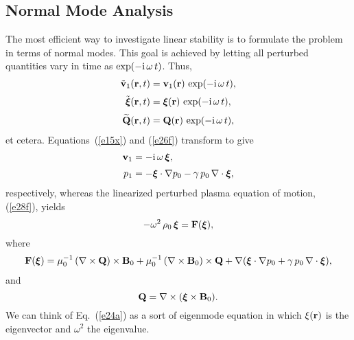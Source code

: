 \documentclass[12pt,prb,aps,notitlepage]{revtex4-1}
\newcommand{\bxi}{\mbox{\boldmath$\xi$}}
\begin{document}
\subsection{Normal Mode Analysis}
The most efficient way to investigate linear stability is to formulate 
 the problem in terms of normal modes. This goal is
achieved by letting all perturbed quantities vary in time as $\exp(-{\rm i}\,\omega\,t)$. 
Thus,
\begin{align}
\tilde{\bf v}_1({\bf r},t) &= {\bf v}_1({\bf r})\, \exp(-{\rm i}\,\omega\,t),\label{e33q}\\[0.5ex]
\tilde{\bxi}({\bf r},t)&= \bxi({\bf r})\, \exp(-{\rm i}\,\omega\,t),\\[0.5ex]
\widetilde{\bf Q}({\bf r},t) &= {\bf Q}({\bf r})\, \exp(-{\rm i}\,\omega\,t),
\end{align}
et cetera. 
Equations~(\ref{e15x}) and (\ref{e26f}) transform to give
\begin{align}\label{e15}
{\bf v}_1 &=-{\rm i}\,\omega\,\bxi,\\[0.5ex]
p_1&= -{\bxi}\cdot\nabla p_0 -\gamma\,p_0\,\nabla\cdot{\bxi},\label{e15t}
\end{align}
respectively, 
whereas the linearized perturbed plasma equation of motion, (\ref{e28f}), yields
\begin{equation}\label{e24a}
-\omega^2\,\rho_0\,\bxi= {\bf F}(\bxi),
\end{equation}
where
\begin{align}\label{e24}
{\bf F}(\bxi) = \mu_0^{-1}\,(\nabla\times {\bf Q})\times{\bf B}_0+ \mu_0^{-1}\, (\nabla\times {\bf B}_0)\times {\bf Q} + 
\nabla(\bxi\cdot \nabla p_0 + \gamma\,p_0\,\nabla\cdot\bxi),
\end{align} 
and
\begin{equation}\label{e25}
{\bf Q} = \nabla\times (\bxi\times {\bf B}_0).
\end{equation}
We can think of Eq.~(\ref{e24a}) as a sort of eigenmode equation in which $\xi({\bf r})$ is the eigenvector and $\omega^2$ the eigenvalue. 
\end{document}
